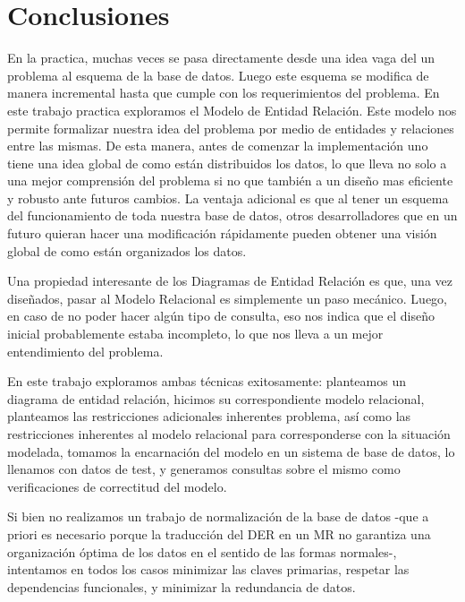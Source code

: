 \documentclass{article}
\theoremstyle{definition}
\theoremstyle{remark}
\begin{document}


\pagebreak

\section{Conclusiones}

En la practica, muchas veces se pasa directamente desde una idea vaga del un problema al esquema de la base de datos. Luego este esquema se modifica de manera incremental hasta que cumple con los requerimientos del problema. En este trabajo practica exploramos el Modelo de Entidad Relación. Este modelo nos permite formalizar nuestra idea del problema por medio de entidades y relaciones entre las mismas. De esta manera, antes de comenzar la implementación uno tiene una idea global de como están distribuidos los datos, lo que lleva no solo a una mejor comprensión del problema si no que también a un diseño mas eficiente y robusto ante futuros cambios. La ventaja adicional es que al tener un esquema del funcionamiento de toda nuestra base de datos, otros desarrolladores que en un futuro quieran hacer una modificación rápidamente pueden obtener una visión global de como están organizados los datos.

Una propiedad interesante de los Diagramas de Entidad Relación es que, una vez diseñados, pasar al Modelo Relacional es simplemente un paso mecánico. Luego, en caso de no poder hacer algún tipo de consulta, eso nos indica que el diseño inicial probablemente estaba incompleto, lo que nos lleva a un mejor entendimiento del problema.

En este trabajo exploramos ambas técnicas exitosamente: planteamos un diagrama de entidad relación, hicimos su correspondiente modelo relacional, planteamos las restricciones adicionales inherentes problema, así como las restricciones inherentes al modelo relacional para corresponderse con la situación modelada, tomamos la encarnación del modelo en un sistema de base de datos, lo llenamos con datos de test, y generamos consultas sobre el mismo como verificaciones de correctitud del modelo.

Si bien no realizamos un trabajo de normalización de la base de datos -que a priori es necesario porque la traducción del DER en un MR no garantiza una organización óptima de los datos en el sentido de las formas normales-, intentamos en todos los casos minimizar las claves primarias, respetar las dependencias funcionales, y minimizar la redundancia de datos.
\end{document}
